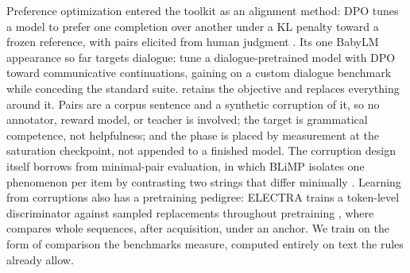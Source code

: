 Preference optimization entered the toolkit as an alignment method: DPO
tunes a model to prefer one completion over another under a KL penalty
toward a frozen reference, with pairs elicited from human judgment
\citep{rafailov2023dpo}. Its one BabyLM appearance so far targets
dialogue: \citet{padovani2025dialogue} tune a dialogue-pretrained model
with DPO toward communicative continuations, gaining on a custom dialogue
benchmark while conceding the standard suite. \MPO{} retains the objective
and replaces everything around it. Pairs are a corpus sentence and a
synthetic corruption of it, so no annotator, reward model, or teacher is
involved; the target is grammatical competence, not helpfulness; and the
phase is placed by measurement at the saturation checkpoint, not appended
to a finished model. The corruption
design itself borrows from minimal-pair evaluation, in which BLiMP
isolates one phenomenon per item by contrasting two strings that differ
minimally \citep{warstadt2020blimp}. Learning from corruptions also has a
pretraining pedigree: ELECTRA trains a token-level discriminator against
sampled replacements throughout pretraining \citep{clark2020electra},
where \MPO{} compares whole sequences, after acquisition, under an
anchor. We train on the form of comparison the benchmarks measure,
computed entirely on text the rules already allow.
